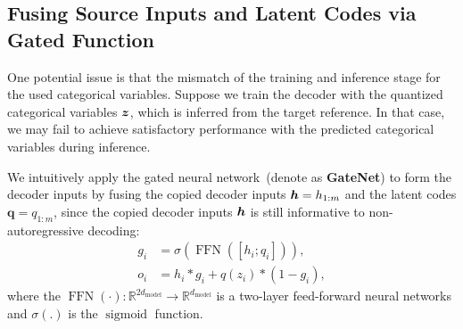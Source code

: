 \subsection{Fusing Source Inputs and Latent Codes via Gated Function}\label{ss:input}
One potential issue is that the mismatch of the training and inference stage for the used categorical variables. 
Suppose we train the decoder with the quantized categorical variables $\bm z$, which is inferred from the target reference. 
In that case, we may fail to achieve satisfactory performance with the predicted categorical variables during inference.

We intuitively apply the gated neural network~(denote as \textbf{GateNet}) to form the decoder inputs by fusing the copied decoder inputs $\bm h=h_{1:m}$ and the latent codes $\bm q=q_{1:m}$, since the copied decoder inputs $\bm h$ is still informative to non-autoregressive decoding:
\begin{equation}
\begin{split}
    g_i &= \sigma(\operatorname{FFN}([h_i;q_i])), \\
     o_i &= h_i*g_i + q(z_i)*(1-g_i), 
\end{split}
\end{equation}
where the $\operatorname{FFN}(\cdot): \mathbb{R}^{2d_\text{model}}\to \mathbb{R}^{d_\text{model}}$ is a two-layer feed-forward neural networks and $\sigma(.)$ is the $\operatorname{sigmoid}$ function.
